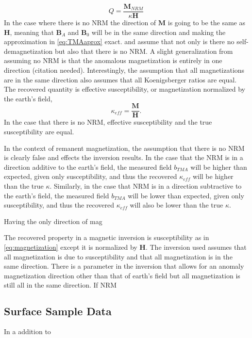 \begin{equation} \label{eq:Koenigsberger}
Q = \frac{\textbf{M}_{NRM}}{ \kappa\textbf{H}}
\end{equation}
In the case where there is no \ac{NRM} the direction of $\mathbf M$ is going to be the same as $\mathbf H$, meaning that $\mathbf B_A$ and $\mathbf B_0$ will be in the same direction and making the approximation in \autoref{eq:TMAaprox} exact. \cite{li19963} and \cite{pilkington19973} assume that not only is there no self-demagnetization but also that there is no \ac{NRM}. A slight generalization from assuming no \ac{NRM} is that the anomalous magnetization is entirely in one direction (citation needed). Interestingly, the assumption that all magnetizations are in the same direction also assumes that all Koenigsberger ratios are equal. The recovered quantity is effective susceptibility, or magnetization normalized by the earth's field,
\begin{equation} \label{eq:effSusc}
\kappa_{eff} =  \frac{\textbf{M}}{\textbf{H}}.
\end{equation}In the case that there is no \ac{NRM}, effective susceptibility and the true susceptibility are equal.

	In the context of remanent magnetization, the assumption that there is no \ac{NRM} is clearly false and effects the inversion results. In the case that the \ac{NRM} is in a direction additive to the earth's field, the measured field $b_{TMA}$ will be higher than expected, given only susceptibility, and thus the recovered $\kappa_{eff}$ will be higher than the true $\kappa$. Similarly, in the case that \ac{NRM} is in a direction subtractive to the earth's field, the measured field $b_{TMA}$ will be lower than expected, given only susceptibility, and thus the recovered $\kappa_{eff}$ will also  be lower than the true $\kappa$.



Having the only direction of mag









The recovered property in a magnetic inversion is susceptibility as in \autoref{eq:magnetization} except it is normalized by $\textbf{H}$. The inversion used assumes that all magnetization is due to susceptibility and that all magnetization is in the same direction. There is a parameter in the inversion that allows for an anomaly magnetization direction other than that of earth's field but all magnetization is still all in the same direction. If \ac{NRM}






\subsection{Surface Sample Data}
\label{sec: Surface Sample Data}

In a addition to 






\endinput

Any text after an \endinput is ignored.
You could put scraps here or things in progress.
